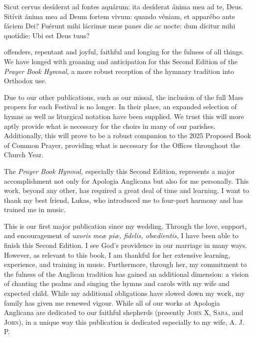 {}
\noindent

\begin{quoting}\par\noindent
	\begin{otherlanguage}{ecclesiasticallatin}
	Sicut cervus desíderat ad fontes aquárum: ita desíderat ánima mea ad te, Deus. Sitívit ánima mea ad Deum fortem vivum: quando véniam, et apparébo ante fáciem Dei? Fuérunt mihi lácrim{\ae} me{\ae} panes die ac nocte: dum dícitur mihi quotídie: Ubi est Deus tuus?
	\end{otherlanguage}
\end{quoting}

\vspace{-0.5\baselineskip}

\par\noindent
{} offenders, repentant and joyful, faithful and longing for the fulness of all things. We have longed with groaning and anticipation for this Second Edition of the \textit{Prayer Book Hymnal,} a more robust reception of the hymnary tradition into Orthodox use.

Due to our other publications, such as our missal, the inclusion of the full Mass propers for each Festival is no longer. In their place, an expanded selection of hymns as well as liturgical notation have been supplied. We trust this will more aptly provide what is necessary for the choirs in many of our parishes. Additionally, this will prove to be a robust companion to the 2025 Proposed Book of Common Prayer, providing what is necessary for the Offices throughout the Church Year.

The \textit{Prayer Book Hymnal,} especially this Second Edition, represents a major accomplishment not only for Apologia Anglicana but also for me personally. This work, beyond any other, has required a great deal of time and learning. I want to thank my best friend, Lukas, who introduced me to four-part harmony and has trained me in music.

This is our first major publication since my wedding. Through the love, support, and encouragement of \textit{uxoris me{\ae} pi{\ae}, fidelis, ob{\oe}dientis,} I have been able to finish this Second Edition. I see God's providence in our marriage in many ways. However, as relevant to this book, I am thankful for her extensive learning, experience, and training in music. Furthermore, through her, my commitment to the fulness of the Anglican tradition has gained an additional dimension: a vision of chanting the psalms and singing the hymns and carols with my wife and expected child. While my additional obligations have slowed down my work, my family has given me renewed vigour. While all of our works at Apologia Anglicana are dedicated to our faithful shepherds (presently \textsc{John X,} \textsc{Saba,} and \textsc{John}), in a unique way this publication is dedicated especially to my wife, A. J. P.\\

